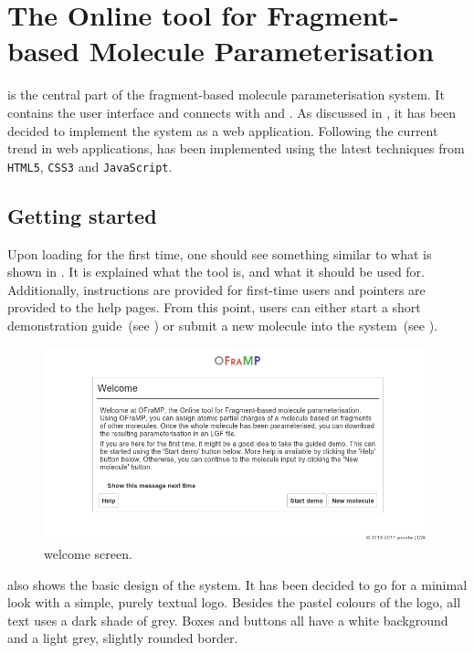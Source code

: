 \section[\oframp]{The Online tool for Fragment-based Molecule Parameterisation}
\oframp{} is the central part of the fragment-based molecule parameterisation system. It contains the user interface and connects with \oapoc{} and \omfraf{}. As discussed in , it has been decided to implement the system as a web application. Following the current trend in web applications, \oframp{} has been implemented using the latest techniques from \verb|HTML5|, \verb|CSS3| and \verb|JavaScript|.

\subsection{Getting started}

Upon loading \oframp{} for the first time, one should see something similar to what is shown in . It is explained what the tool is, and what it should be used for. Additionally, instructions are provided for first-time users and pointers are provided to the help pages. From this point, users can either start a short demonstration guide~(see ) or submit a new molecule into the system~(see ).

\begin{figure}
\center
\includegraphics[width=.9\textwidth]{img/impl_welcome.png}
\caption{\oframp{} welcome screen.}
\end{figure}

 also shows the basic design of the system. It has been decided to go for a minimal look with a simple, purely textual logo. Besides the pastel colours of the logo, all text uses a dark shade of grey. Boxes and buttons all have a white background and a light grey, slightly rounded border.

